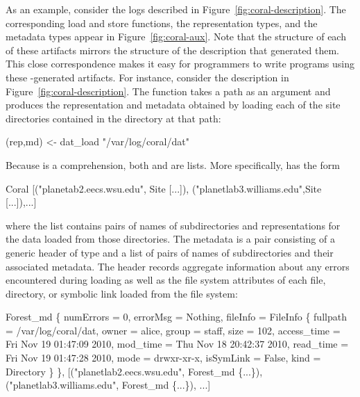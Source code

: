 As an example, consider the \coral{} logs described in
Figure~\ref{fig:coral-description}.  The corresponding load and store
functions, the representation types, and the metadata types appear in
Figure~\ref{fig:coral-aux}. Note that the structure of each of these
artifacts mirrors the structure of the \forest{}
description that generated them. This close correspondence makes it
easy for programmers to write programs using these \forest{}-generated artifacts.
%
For instance, consider the  description in
Figure~\ref{fig:coral-description}. The  function takes
a path as an argument and produces the representation and metadata
obtained by loading each of the site directories contained in the
directory at that path:
%
\begin{code}
(rep,md) <- dat_load "/var/log/coral/dat"
\end{code}
Because  is a comprehension, both  and  are
lists. More specifically,  has the form
\begin{code}
Coral [("planetab2.eecs.wsu.edu", Site [...]),
       ("planetlab3.williams.edu",Site [...]),...]
\end{code}
where the list contains pairs of names of subdirectories and
representations for the data loaded from those directories. The
metadata is a pair consisting of a generic header of type
 and a list of pairs of names of subdirectories and
their associated metadata. The header records aggregate information
about any errors encountered during loading as well as the file system
attributes of each file, directory, or symbolic link loaded from the
file system:
%
\begin{code}
Forest_md 
  \{ numErrors = 0, 
    errorMsg = Nothing, 
    fileInfo = FileInfo
      \{ fullpath = /var/log/coral/dat, 
        owner = alice, group = staff, size = 102, 
        access_time = Fri Nov 19 01:47:09 2010, 
        mod_time = Thu Nov 18 20:42:37 2010, 
        read_time = Fri Nov 19 01:47:28 2010, 
        mode = drwxr-xr-x, isSymLink = False, 
        kind = Directory \} \},
[("planetlab2.eecs.wsu.edu", Forest_md \{...\}),
 ("planetlab3.williams.edu", Forest_md \{...\}), ...]
\end{code}

